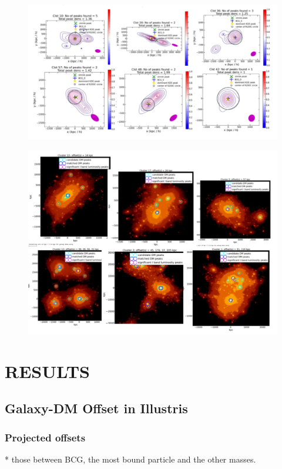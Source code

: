 \documentclass[usenatbib]{mn2e}
\begin{document}
\begin{figure}
	\includegraphics[width=.95\linewidth]{figures/ph_fig_galaxycenter_IllustrisClusters.pdf}
	\caption{
		\label{fig:centers}}
\end{figure}


\begin{figure}
	\includegraphics[width=.95\linewidth]{figures/ph_fig_DMcenter_IllustrisClusters.pdf}
	\caption{}
\end{figure}

\section{RESULTS} 

\subsection{Galaxy-DM Offset in Illustris}
\subsubsection{Projected offsets}
* those between BCG, the most bound particle and the other masses. 
\end{document}
